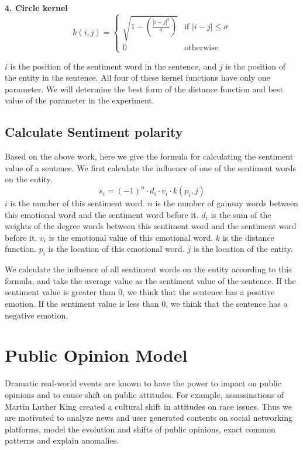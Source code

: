 \documentclass[runningheads]{llncs}
\begin{document}
\textbf{4. Circle kernel}
\begin{equation}
k(i,j)=\begin{cases}
\sqrt{1-\left(\frac{|i-j|^2}{\sigma}\right)} &\mbox{if $|i-j|\leq \sigma$}\\
0 &\mbox{otherwise}
\end{cases}
\end{equation}

$i$ is the position of the sentiment word in the sentence, and $j$ is the position of the entity in the sentence. All four of these kernel functions have only one parameter. We will determine the best form of the distance function and best value of the parameter in the experiment.

\subsection{Calculate Sentiment polarity}
Based on the above work, here we give the formula for calculating the sentiment value of a sentence. We first calculate the influence of one of the sentiment words on the entity.
\begin{equation}
    s_i = (-1)^n\cdot d_i\cdot v_i\cdot k(p_i,j)
\end{equation}
$i$ is the number of this sentiment word. $n$ is the number of gainsay words between this emotional word and the sentiment word before it. $d_i$ is the sum of the weights of the degree words between this sentiment word and the sentiment word before it. $v_i$ is the emotional value of this emotional word. $k$ is the distance function. $p_i$ is the location of this emotional word. $j$ is the location of the entity.

We calculate the influence of all sentiment words on the entity according to this formula, and take the average value as the sentiment value of the sentence. If the sentiment value is greater than 0, we think that the sentence has a positive emotion. If the sentiment value is less than 0, we think that the sentence has a negative emotion.
\section{Public Opinion Model}\label{sec:public opinion model}
Dramatic real-world events are known to have the power to impact on public opinions and to cause shift on public attitudes. For example, assassinations of Martin Luther King created a cultural shift in attitudes on race issues. Thus we are motivated to analyze news and user generated contents on social networking platforms, model the evolution and shifts of public opinions,  exact common patterns and explain anomalies.
\end{document}
